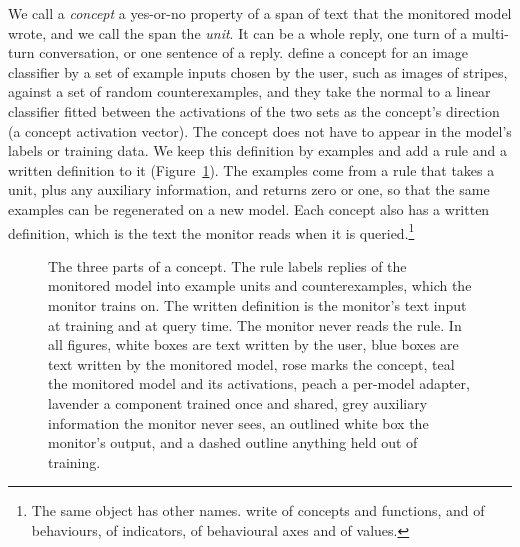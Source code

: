 \documentclass{article}
\begin{document}
We call a \emph{concept} a yes-or-no property of a span of text that the monitored model wrote, and we call the span the \emph{unit}. It can be a whole reply, one turn of a multi-turn conversation, or one sentence of a reply. \cite{kim2018tcav} define a concept for an image classifier by a set of example inputs chosen by the user, such as images of stripes, against a set of random counterexamples, and they take the normal to a linear classifier fitted between the activations of the two sets as the concept's direction (a concept activation vector). The concept does not have to appear in the model's labels or training data. We keep this definition by examples and add a rule and a written definition to it (Figure~\ref{fig:concept}). The examples come from a rule that takes a unit, plus any auxiliary information, and returns zero or one, so that the same examples can be regenerated on a new model. Each concept also has a written definition, which is the text the monitor reads when it is queried.\footnote{The same object has other names. \cite{zou2023} write of concepts and functions, \cite{kirch2025} and \cite{boxo2025} of behaviours, \cite{zhou2026} of indicators, \cite{kim2026bus} of behavioural axes and \cite{huang2025values} of values.}

\begin{figure}[t]
\centering
\resizebox{0.74\textwidth}{!}{}
\caption{The three parts of a concept. The rule labels replies of the monitored model into example units and counterexamples, which the monitor trains on. The written definition is the monitor's text input at training and at query time. The monitor never reads the rule. In all figures, white boxes are text written by the user, blue boxes are text written by the monitored model, rose marks the concept, teal the monitored model and its activations, peach a per-model adapter, lavender a component trained once and shared, grey auxiliary information the monitor never sees, an outlined white box the monitor's output, and a dashed outline anything held out of training.}
\label{fig:concept}
\end{figure}
\end{document}
